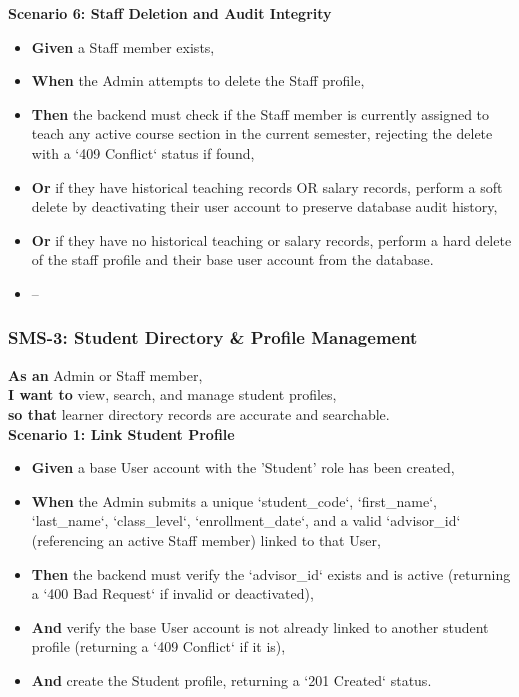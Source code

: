 \noindent\textbf{Scenario 6: Staff Deletion and Audit Integrity}\\
\begin{itemize}
  \item \textbf{Given} a Staff member exists,
  \item \textbf{When} the Admin attempts to delete the Staff profile,
  \item \textbf{Then} the backend must check if the Staff member is currently assigned to teach any active course section in the current semester, rejecting the delete with a `409 Conflict` status if found,
  \item \textbf{Or} if they have historical teaching records OR salary records, perform a soft delete by deactivating their user account to preserve database audit history,
  \item \textbf{Or} if they have no historical teaching or salary records, perform a hard delete of the staff profile and their base user account from the database.
\end{itemize}

\begin{itemize}
  \item --
\end{itemize}

\subsubsection{SMS-3: Student Directory \& Profile Management}
\noindent \textbf{As an} Admin or Staff member, \\
\noindent \textbf{I want to} view, search, and manage student profiles, \\
\noindent \textbf{so that} learner directory records are accurate and searchable. \\



\noindent\textbf{Scenario 1: Link Student Profile}\\
\begin{itemize}
  \item \textbf{Given} a base User account with the 'Student' role has been created,
  \item \textbf{When} the Admin submits a unique `student\_code`, `first\_name`, `last\_name`, `class\_level`, `enrollment\_date`, and a valid `advisor\_id` (referencing an active Staff member) linked to that User,
  \item \textbf{Then} the backend must verify the `advisor\_id` exists and is active (returning a `400 Bad Request` if invalid or deactivated),
  \item \textbf{And} verify the base User account is not already linked to another student profile (returning a `409 Conflict` if it is),
  \item \textbf{And} create the Student profile, returning a `201 Created` status.
\end{itemize}



